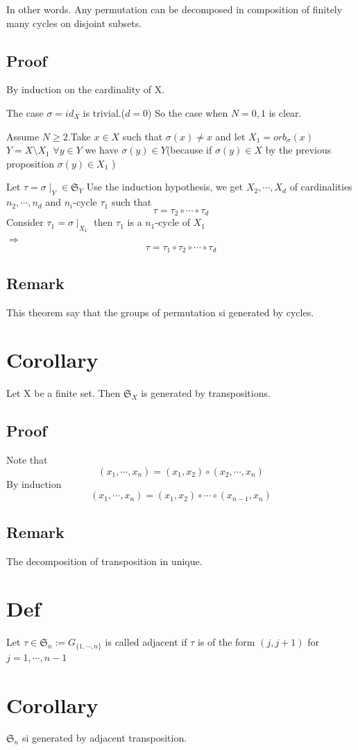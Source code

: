 \documentclass{book}
\begin{document}
In other words. Any permutation can be decomposed in composition of finitely many cycles on disjoint subsets.
\subsection*{Proof}
By induction on the cardinality of X.

The case $\sigma=id_X$ is trivial.($d=0$)
So the case when $N=0,1$ is clear.

Assume $N\geq 2$.Take $x\in X$ such that $\sigma(x)\neq x$
and let $X_1=orb_\sigma(x)$ $Y=X\setminus X_1$ $\forall y\in Y$ we have $\sigma(y)\in Y$(because if $\sigma(y)\in X$ by the previous proposition $\sigma(y)\in X_1$ )

Let $\tau=\sigma\mid_Y\in \mathfrak{S}_Y$ Use the induction hypothesis, we get $X_2,\cdots,X_d$ of cardinalities $n_2,\cdots,n_d$ and $n_i$-cycle $\tau_1$ such that
$$\tau=\tau_2\circ\cdots\circ\tau_d$$
Consider $\tau_1=\sigma\mid_{X_1}$ then $\tau_1$ is a $n_1$-cycle of $X_1$
\\$\Rightarrow$$$\tau=\tau_1\circ\tau_2\circ\cdots\circ\tau_d$$
\subsection{Remark}
This theorem say that the groups of permutation si generated by cycles.
\section{Corollary}
Let X be a finite set. Then $\mathfrak{S}_X$ is generated by transpositions.
\subsection*{Proof}
Note that $$(x_1,\cdots,x_n)=(x_1,x_2)\circ(x_2,\cdots,x_n)$$
By induction
$$(x_1,\cdots,x_n)=(x_1,x_2)\circ\cdots\circ(x_{n-1},x_n)$$
\subsection{Remark}
The decomposition of  transposition in unique.
\section{Def}
Let $\tau\in \mathfrak{S}_n:=G_{\{1,\cdots,n\}}$ is called adjacent if $\tau $ is of the form $(j,j+1)$ for $j=1,\cdots,n-1$
\section{Corollary}
$\mathfrak{S}_n$ si generated by adjacent transposition.
\end{document}

